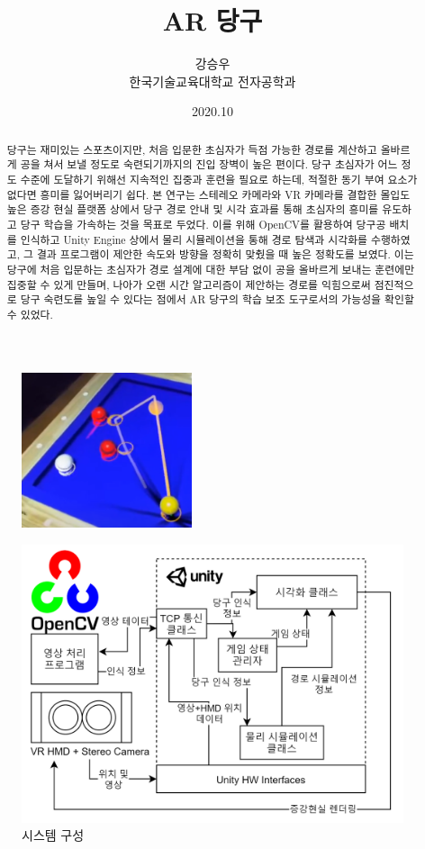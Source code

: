 \documentclass[10pt]{oblivoir}
\title{AR 당구}
\author{강승우 \\ 한국기술교육대학교 전자공학과}
\date{2020.10}
\begin{document}
\maketitle

\begin{figure}[ht]
    \centering
    \includegraphics[width=5cm]{img/abstract-final.png}
\end{figure}

\begin{abstract}
    당구는 재미있는 스포츠이지만, 처음 입문한 초심자가 득점 가능한 경로를 계산하고 올바르게 공을 쳐서 보낼 정도로 숙련되기까지의 진입 장벽이 높은 편이다. 당구 초심자가 어느 정도 수준에 도달하기 위해선 지속적인 집중과 훈련을 필요로 하는데, 적절한 동기 부여 요소가 없다면 흥미를 잃어버리기 쉽다. 본 연구는 스테레오 카메라와 VR 카메라를 결합한 몰입도 높은 증강 현실 플랫폼 상에서 당구 경로 안내 및 시각 효과를 통해 초심자의 흥미를 유도하고 당구 학습을 가속하는 것을 목표로 두었다. 이를 위해 OpenCV를 활용하여 당구공 배치를 인식하고 Unity Engine 상에서 물리 시뮬레이션을 통해 경로 탐색과 시각화를 수행하였고, 그 결과 프로그램이 제안한 속도와 방향을 정확히 맞췄을 때 높은 정확도를 보였다. 이는 당구에 처음 입문하는 초심자가 경로 설계에 대한 부담 없이 공을 올바르게 보내는 훈련에만 집중할 수 있게 만들며, 나아가 오랜 시간 알고리즘이 제안하는 경로를 익힘으로써 점진적으로 당구 숙련도를 높일 수 있다는 점에서 AR 당구의 학습 보조 도구로서의 가능성을 확인할 수 있었다.
\end{abstract}

\newpage
\twocolumn[]

\begin{figure}
    \centering
    \includegraphics[width=14cm]{img/overall-process.png}
    \caption{시스템 구성}
    \label{fig;overall-proc}
\end{figure}
\end{document}
